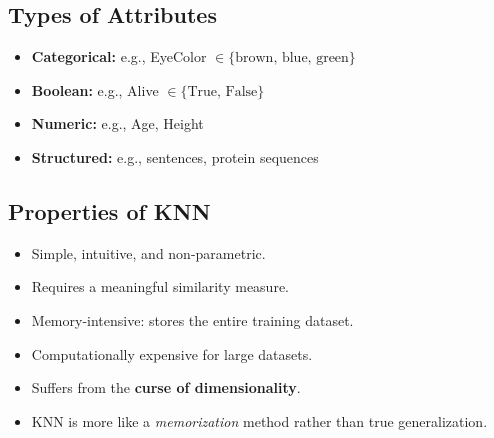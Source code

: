 \subsection{Types of Attributes}
\begin{itemize}
    \item \textbf{Categorical:} e.g., EyeColor $\in \{\text{brown, blue, green}\}$
    \item \textbf{Boolean:} e.g., Alive $\in \{\text{True, False}\}$
    \item \textbf{Numeric:} e.g., Age, Height
    \item \textbf{Structured:} e.g., sentences, protein sequences
\end{itemize}

\subsection{Properties of KNN}
\begin{itemize}
    \item Simple, intuitive, and non-parametric.
    \item Requires a meaningful similarity measure.
    \item Memory-intensive: stores the entire training dataset.
    \item Computationally expensive for large datasets.
    \item Suffers from the \textbf{curse of dimensionality}.
    \item KNN is more like a \textit{memorization} method rather than true generalization.
\end{itemize}
